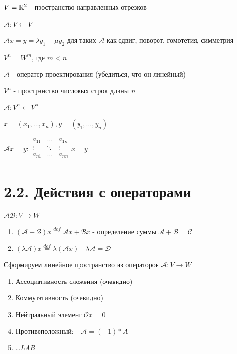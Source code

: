 \documentclass[12pt]{article}
\begin{document}
     $V = \mathbb{R}^2$ - пространство направленных отрезков

    $\mathcal{A}: V \leftarrow V$

    $\mathcal{A}x = y = \lambda y_1 + \mu y_2$ для таких $\mathcal{A}$ как сдвиг, поворот, гомотетия, симметрия

     $V^n = W^m$, где $m < n$

    $\mathcal{A}$ - оператор проектирования (убедиться, что он линейный)

     $V^n$ - пространство числовых строк длины $n$

    $\mathcal{A}: V^n \leftarrow V^n$

    $x = (x_1, \dots, x_n), y = (y_1, \dots, y_n)$

    $\mathcal{A}x = y : \begin{array}{|ccc|}
    a_{11} & \ldots & a_{1n}\\
    \vdots & \ddots & \vdots\\
    a_{n1} & \ldots & a_{nn}\\
    \end{array}x = y$


    \section{2.2. Действия с операторами}

    \Def $\mathcal{A}\mathcal{B}: V \rightarrow W$

    \begin{enumerate}
        \item $(\mathcal{A} + \mathcal{B})x \stackrel{def}{=} \mathcal{A}x + \mathcal{B}x$ - определение суммы $\mathcal{A} + \mathcal{B} = \mathcal{C}$
        \item $(\lambda\mathcal{A})x \stackrel{def}{=} \lambda(\mathcal{A}x)$ - $\lambda\mathcal{A} = \mathcal{D}$
    \end{enumerate}

    \Nota Сформируем линейное пространство из операторов $\mathcal{A}: V \rightarrow W$

    \begin{enumerate}
        \item Ассоциативность сложения (очевидно)
        \item Коммутативность (очевидно)
        \item Нейтральный элемент $\mathcal{O}x = 0$
        \item Противоположный: $-\mathcal{A} = (-1) * A$
        \item \dots \textit{LAB}
    \end{enumerate}
\end{document}
